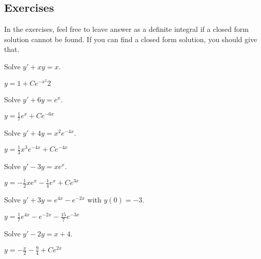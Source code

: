 
\subsection{Exercises}

In the exercises, feel free to leave answer as a definite integral if a
closed form solution cannot be found.  If you can find a closed form
solution, you should give that.

\begin{exercise}
Solve $y' + xy = x$.
\end{exercise}
\comboSol{%
}
{%
$y = 1 + Ce^{-x^2}{2}$
}

\begin{exercise}
Solve $y' + 6y = e^x$.
\end{exercise}
\comboSol{%
}
{%
$y = \frac{1}{7}e^x + Ce^{-6x}$
}

\begin{exercise}
Solve $y' + 4y = x^2e^{-4x}$.
\end{exercise}
\comboSol{%
}
{%
$y = \frac{1}{3}x^3e^{-4x} + Ce^{-4x}$
}

\begin{exercise}
Solve $y' - 3y = xe^x$.
\end{exercise}
\comboSol{%
}
{%
$y = -\frac{1}{2}xe^{x} - \frac{1}{4}e^x + Ce^{3x}$
}

\begin{exercise}
Solve $y' + 3y = e^{4x} - e^{-2x}$ with $y(0) = -3$.
\end{exercise}
\comboSol{%
}
{%
$y = \frac{1}{7}e^{4x} - e^{-2x} - \frac{15}{7}e^{-3x}$
}

\begin{exercise}
Solve $y' - 2y = x + 4$.
\end{exercise}
\comboSol{%
}
{%
$y = -\frac{x}{2} - \frac{9}{4} + Ce^{2x}$
}

